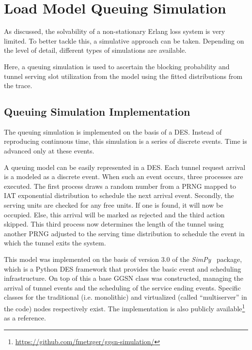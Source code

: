 \section{Load Model Queuing Simulation} 
\label{c4:simulation}

As discussed, the solvability of a non-stationary Erlang loss system is very limited. To better tackle this, a simulative approach can be taken. Depending on the level of detail, different types of simulations are available.

Here, a queuing simulation is used to ascertain the blocking probability and tunnel serving slot utilization from the model using the fitted distributions from the trace.


\subsection{Queuing Simulation Implementation}

The queuing simulation is implemented on the basis of a \gls{DES}. Instead of reproducing continuous time, this simulation is a series of discrete events. Time is advanced only at these events. 

A queuing model can be easily represented in a \gls{DES}.  Each tunnel request arrival is a modeled as a discrete event. When such an event occurs, three processes are executed. The first process draws a random number from a \gls{PRNG} mapped to \gls{IAT} exponential distribution to schedule the next arrival event. Secondly, the serving units are checked for any free units. If one is found, it will now be occupied. Else, this arrival will be marked as rejected and the third action skipped. This third process now determines the length of the tunnel using another \gls{PRNG} adjusted to the serving time distribution to schedule the event in which the tunnel exits the system.

This model was implemented on the basis of version 3.0 of the \textit{SimPy}~\cite{simpy} package, which is a Python \gls{DES} framework that provides the basic event and scheduling infrastructure. On top of this a base \gls{GGSN} class was constructed, managing the arrival of tunnel events and the scheduling of the service ending events. Specific classes for the traditional (i.e. monolithic) and virtualized (called ``multiserver'' in the code) nodes respectively exist. The implementation is also publicly available\footnote{\url{https://github.com/fmetzger/ggsn-simulation/}} as a reference. 


